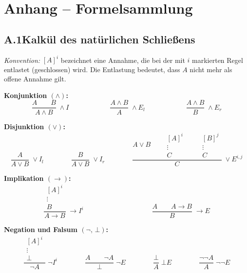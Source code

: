 \newpage
\section*{Anhang -- Formelsammlung}

\subsection*{A.1\quad Kalkül des natürlichen Schließens}

\textit{Konvention:} $[A]^i$ bezeichnet eine Annahme, die bei der mit $i$ markierten Regel entlastet (geschlossen) wird. Die Entlastung bedeutet, dass $A$ nicht mehr als offene Annahme gilt.

\medskip
\noindent\textbf{Konjunktion $(\wedge)$:}
\[
\dfrac{A \qquad B}{A \wedge B}\;\wedge I
\qquad\qquad\qquad
\dfrac{A \wedge B}{A}\;\wedge E_l
\qquad\qquad\qquad
\dfrac{A \wedge B}{B}\;\wedge E_r
\]

\medskip
\noindent\textbf{Disjunktion $(\vee)$:}
\[
\dfrac{A}{A \vee B}\;\vee I_l
\qquad\qquad
\dfrac{B}{A \vee B}\;\vee I_r
\qquad\qquad
\dfrac{A \vee B \qquad \begin{array}{c}[A]^i \\ \vdots \\ C\end{array} \qquad \begin{array}{c}[B]^j \\ \vdots \\ C\end{array}}{C}\;\vee E^{i,j}
\]

\medskip
\noindent\textbf{Implikation $(\to)$:}
\[
\dfrac{\begin{array}{c}[A]^i \\ \vdots \\ B\end{array}}{A \to B}\;{\to I^i}
\qquad\qquad\qquad\qquad\qquad
\dfrac{A \qquad A \to B}{B}\;{\to E}
\]

\medskip
\noindent\textbf{Negation und Falsum $(\neg,\, \bot)$:}
\[
\dfrac{\begin{array}{c}[A]^i \\ \vdots \\ \bot\end{array}}{\neg A}\;{\neg I^i}
\qquad\qquad
\dfrac{A \qquad \neg A}{\bot}\;{\neg E}
\qquad\qquad
\dfrac{\bot}{A}\;{\bot E}
\qquad\qquad
\dfrac{\neg\neg A}{A}\;{\neg\neg E}
\]

